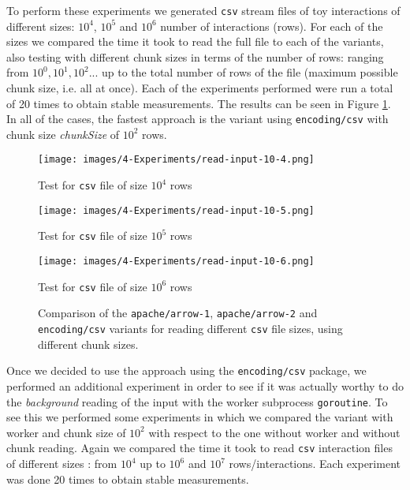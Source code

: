To perform these experiments we generated \texttt{csv} stream files of toy interactions of different sizes: $10^4$, $10^5$ and $10^6$ number of interactions (rows). For each of the sizes we compared the time it took to read the full file to each of the variants, also testing with different chunk sizes in terms of the number of rows: ranging from $10^0, 10^1, 10^2...$ up to the total number of rows of the file (maximum possible chunk size, i.e. all at once). Each of the experiments performed were run a total of 20 times to obtain stable measurements. The results can be seen in Figure \ref{img:exps-read-input-variants}. In all of the cases, the fastest approach is the variant using \texttt{encoding/csv} with chunk size \emph{chunkSize} of $10^2$ rows.\\

\begin{figure}[H]
  \centering
  \begin{minipage}{0.48\textwidth}
    \centering
    \texttt{[image: images/4-Experiments/read-input-10-4.png]}
    \caption*{Test for \texttt{csv} file of size $10^4$ rows}
  \end{minipage}
  \hfill
  \begin{minipage}{0.48\textwidth}
    \centering
    \texttt{[image: images/4-Experiments/read-input-10-5.png]}
    \caption*{Test for \texttt{csv} file of size $10^5$ rows}
  \end{minipage}
  
  \vspace{0.5cm} %

  \begin{minipage}{0.6\textwidth}
    \centering
    \texttt{[image: images/4-Experiments/read-input-10-6.png]}
    \caption*{Test for \texttt{csv} file of size $10^6$ rows}
  \end{minipage}
  \caption{Comparison of the \texttt{apache/arrow-1}, \texttt{apache/arrow-2} and \texttt{encoding/csv} variants for reading different \texttt{csv} file sizes, using different chunk sizes.}
  \label{img:exps-read-input-variants}
\end{figure}

Once we decided to use the approach using the \texttt{encoding/csv} package, we performed an additional experiment in order to see if it was actually worthy to do the \emph{background} reading of the input with the worker subprocess \texttt{goroutine}. To see this we performed some experiments in which we compared the variant with worker and chunk size of $10^2$ with respect to the one without worker and without chunk reading. Again we compared the time it took to read \texttt{csv} interaction files of different sizes : from $10^4$ up to $10^6$ and $10^7$ rows/interactions. Each experiment was done 20 times to obtain stable measurements.\\

